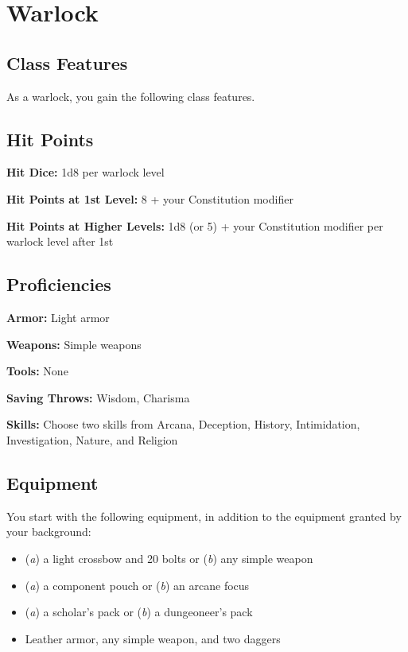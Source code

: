 \section{Warlock}

\subsection{Class Features}

As a warlock, you gain the following class features.

\subsection{Hit Points}

\textbf{Hit Dice:} 1d8 per warlock level

\textbf{Hit Points at 1st Level:} 8 + your Constitution modifier

\textbf{Hit Points at Higher Levels:} 1d8 (or 5) + your Constitution modifier per warlock level after 1st

\subsection{Proficiencies}

\textbf{Armor:} Light armor

\textbf{Weapons:} Simple weapons

\textbf{Tools:} None

\textbf{Saving Throws:} Wisdom, Charisma

\textbf{Skills:} Choose two skills from Arcana, Deception, History, Intimidation, Investigation, Nature, and Religion

\subsection{Equipment}

You start with the following equipment, in addition to the equipment granted by your background:
\begin{itemize}
\item (\textit{a}) a light crossbow and 20 bolts or (\textit{b}) any simple weapon
\item (\textit{a}) a component pouch or (\textit{b}) an arcane focus
\item (\textit{a}) a scholar's pack or (\textit{b}) a dungeoneer's pack
\item Leather armor, any simple weapon, and two daggers
\end{itemize}

